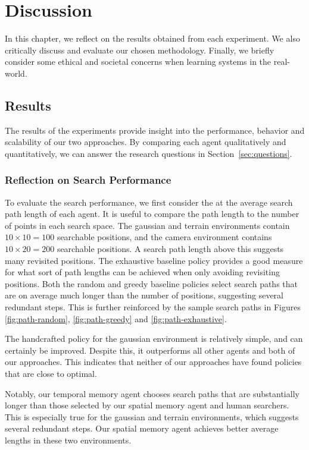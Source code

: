 \chapter{Discussion}
\label{cha:discussion}

In this chapter, we reflect on the results obtained from each experiment.
We also critically discuss and evaluate our chosen methodology.
Finally, we briefly consider some ethical and societal concerns when learning systems in the real-world.

\section{Results}
\label{sec:discussion-results}

The results of the experiments provide insight into the performance, behavior and scalability of our two approaches.
By comparing each agent qualitatively and quantitatively, we can answer the research questions in Section~\ref{sec:questions}.

\subsection{Reflection on Search Performance}

To evaluate the search performance, we first consider the at the average search path length of each agent.
It is useful to compare the path length to the number of points in each search space.
The gaussian and terrain environments contain \(10 \times 10 = 100\) searchable positions, and the camera environment contains \(10 \times 20 = 200\) searchable positions.
A search path length above this suggests many revisited positions.
The exhaustive baseline policy provides a good measure for what sort of path lengths can be achieved when only avoiding revisiting positions.
Both the random and greedy baseline policies select search paths that are on average much longer than the number of positions, suggesting several redundant steps.
This is further reinforced by the sample search paths in Figures \ref{fig:path-random}, \ref{fig:path-greedy} and \ref{fig:path-exhaustive}.

The handcrafted policy for the gaussian environment is relatively simple, and can certainly be improved.
Despite this, it outperforms all other agents and both of our approaches.
This indicates that neither of our approaches have found policies that are close to optimal.

Notably, our temporal memory agent chooses search paths that are substantially longer than those selected by our spatial memory agent and human searchers.
This is especially true for the gaussian and terrain environments, which suggests several redundant steps.
Our spatial memory agent achieves better average lengths in these two environments.


